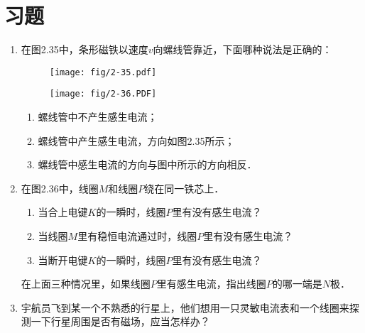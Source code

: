 \section*{习题}
\begin{enumerate}
    \item 在图2.35中，条形磁铁以速度$v$向螺线管靠近，下面哪种说法是正确的：

\begin{figure}[htp]
\centering
\begin{minipage}[t]{0.48\textwidth}
\centering
\texttt{[image: fig/2-35.pdf]}
\caption{}
\end{minipage}
\begin{minipage}[t]{0.48\textwidth}
\centering
\texttt{[image: fig/2-36.PDF]}
\caption{}
\end{minipage}
\end{figure}

    \begin{enumerate}
\item 螺线管中不产生感生电流；
\item 螺线管中产生感生电流，方向如图2.35所示；
\item 螺线管中感生电流的方向与图中所示的方向相反．
    \end{enumerate}
    
    \item 在图2.36中，线圈$M$和线圈$P$绕在同一铁芯上．
    \begin{enumerate}
        \item 当合上电键$K$的一瞬时，线圈$P$里有没有感生电流？
        \item 当线圈$M$里有稳恒电流通过时，线圈$P$里有没有感生电流？
        \item 当断开电键$K$的一瞬时，线圈$P$里有没有感生电流？
    \end{enumerate}
    在上面三种情况里，如果线圈$P$里有感生电流，指出线圈$P$的哪一端是$N$极．
    \item 宇航员飞到某一个不熟悉的行星上，他们想用一只灵敏电流表和一个线圈来探测一下行星周围是否有磁场，应当怎样办？
   

\end{enumerate}
